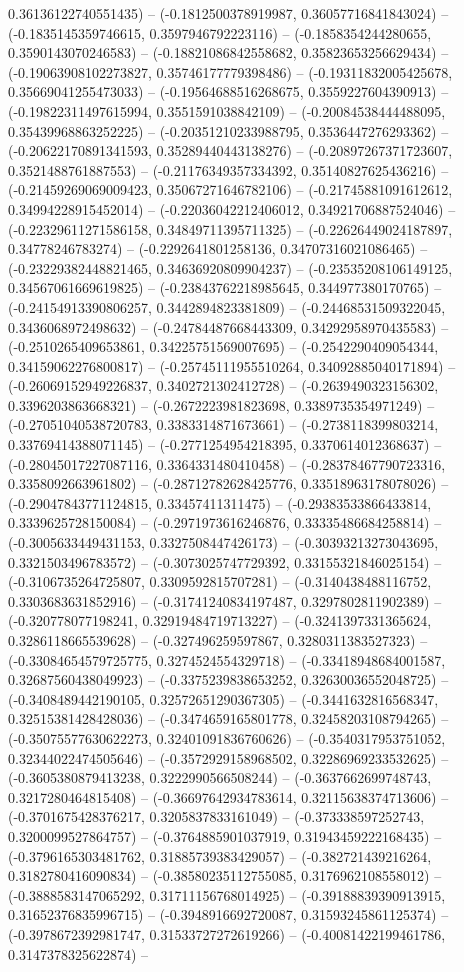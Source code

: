 0.36136122740551435) -- (-0.1812500378919987, 0.36057716841843024) -- (-0.1835145359746615, 0.3597946792223116) -- (-0.1858354244280655, 0.3590143070246583) -- (-0.18821086842558682, 0.35823653256629434) -- (-0.19063908102273827, 0.35746177779398486) -- (-0.19311832005425678, 0.35669041255473033) -- (-0.19564688516268675, 0.3559227604390913) -- (-0.19822311497615994, 0.3551591038842109) -- (-0.20084538444488095, 0.35439968863252225) -- (-0.20351210233988795, 0.3536447276293362) -- (-0.20622170891341593, 0.35289440443138276) -- (-0.20897267371723607, 0.3521488761887553) -- (-0.21176349357334392, 0.35140827625436216) -- (-0.21459269069009423, 0.35067271646782106) -- (-0.21745881091612612, 0.34994228915452014) -- (-0.22036042212406012, 0.34921706887524046) -- (-0.22329611271586158, 0.34849711395711325) -- (-0.22626449024187897, 0.34778246783274) -- (-0.2292641801258136, 0.34707316021086465) -- (-0.23229382448821465, 0.34636920809904237) -- (-0.23535208106149125, 0.34567061669619825) -- (-0.23843762218985645, 0.344977380170765) -- (-0.24154913390806257, 0.3442894823381809) -- (-0.24468531509322045, 0.3436068972498632) -- (-0.24784487668443309, 0.34292958970435583) -- (-0.2510265409653861, 0.34225751569007695) -- (-0.2542290409054344, 0.34159062276800817) -- (-0.25745111955510264, 0.34092885040171894) -- (-0.26069152949226837, 0.3402721302412728) -- (-0.2639490323156302, 0.3396203863668321) -- (-0.2672223981823698, 0.3389735354971249) -- (-0.27051040538720783, 0.3383314871673661) -- (-0.2738118399803214, 0.33769414388071145) -- (-0.2771254954218395, 0.3370614012368637) -- (-0.28045017227087116, 0.3364331480410458) -- (-0.28378467790723316, 0.3358092663961802) -- (-0.28712782628425776, 0.33518963178078026) -- (-0.29047843771124815, 0.33457411311475) -- (-0.29383533866433814, 0.3339625728150084) -- (-0.2971973616246876, 0.33335486684258814) -- (-0.3005633449431153, 0.3327508447426173) -- (-0.30393213273043695, 0.3321503496783572) -- (-0.3073025747729392, 0.33155321846025154) -- (-0.3106735264725807, 0.3309592815707281) -- (-0.3140438488116752, 0.3303683631852916) -- (-0.31741240834197487, 0.3297802811902389) -- (-0.320778077198241, 0.32919484719713227) -- (-0.3241397331365624, 0.3286118665539628) -- (-0.327496259597867, 0.3280311383527323) -- (-0.33084654579725775, 0.3274524554329718) -- (-0.33418948684001587, 0.32687560438049923) -- (-0.3375239838653252, 0.32630036552048725) -- (-0.3408489442190105, 0.32572651290367305) -- (-0.3441632816568347, 0.32515381428428036) -- (-0.3474659165801778, 0.32458203108794265) -- (-0.35075577630622273, 0.32401091836760626) -- (-0.3540317953751052, 0.32344022474505646) -- (-0.3572929158968502, 0.32286969233532625) -- (-0.3605380879413238, 0.3222990566508244) -- (-0.3637662699748743, 0.3217280464815408) -- (-0.36697642934783614, 0.32115638374713606) -- (-0.3701675428376217, 0.3205837833161049) -- (-0.373338597252743, 0.3200099527864757) -- (-0.3764885901037919, 0.31943459222168435) -- (-0.3796165303481762, 0.31885739383429057) -- (-0.382721439216264, 0.3182780416090834) -- (-0.38580235112755085, 0.3176962108558012) -- (-0.3888583147065292, 0.31711156768014925) -- (-0.39188839390913915, 0.31652376835996715) -- (-0.3948916692720087, 0.31593245861125374) -- (-0.3978672392981747, 0.31533727272619266) -- (-0.40081422199461786, 0.3147378325622874) -- 
